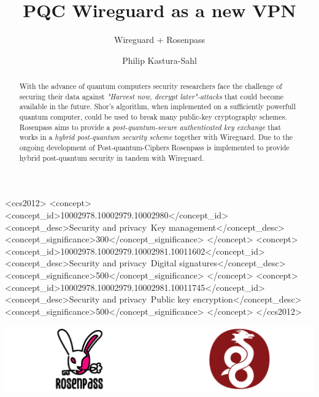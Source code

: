 \documentclass[sigconf]{acmart}
\begin{document}
\title{PQC Wireguard as a new VPN}
\subtitle{Wireguard + Rosenpass}

\author{Philip Kastura-Sahl}

\renewcommand{\shortauthors}{Philip Kastura-Sahl}

\begin{abstract}
  With the advance of quantum computers security researchers face the challenge of securing their data against \textit{"Harvest now, decrypt later"-attacks} that could become available in the future. Shor's algorithm\cite{Shor_1997}, when implemented on a sufficiently powerfull quantum computer, could be used to break many public-key cryptography schemes. Rosenpass aims to provide a \textit{post-quantum-secure authenticated key exchange} that works in a \textit{hybrid post-quantum security scheme} together with Wireguard. Due to the ongoing development of Post-quantum-Ciphers Rosenpass is implemented to provide hybrid post-quantum security in tandem with Wireguard.\cite{rosenpass-about}
\end{abstract}

\begin{CCSXML}
<ccs2012>
   <concept>
       <concept_id>10002978.10002979.10002980</concept_id>
       <concept_desc>Security and privacy~Key management</concept_desc>
       <concept_significance>300</concept_significance>
       </concept>
   <concept>
       <concept_id>10002978.10002979.10002981.10011602</concept_id>
       <concept_desc>Security and privacy~Digital signatures</concept_desc>
       <concept_significance>500</concept_significance>
       </concept>
   <concept>
       <concept_id>10002978.10002979.10002981.10011745</concept_id>
       <concept_desc>Security and privacy~Public key encryption</concept_desc>
       <concept_significance>500</concept_significance>
       </concept>
 </ccs2012>
\end{CCSXML}



\begin{teaserfigure}
  \centering
  \includegraphics[width=\textwidth]{graphics/rosenpass+wireguard.pdf}
\end{teaserfigure}
\end{document}
